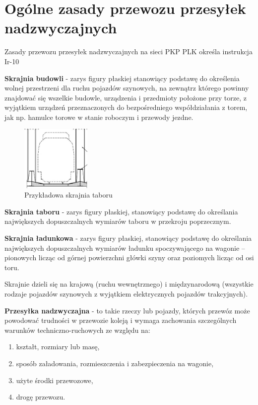 \chapter{Ogólne zasady przewozu przesyłek nadzwyczajnych}
Zasady przewozu przesyłek nadzwyczajnych na sieci PKP PLK określa instrukcja Ir-10

\textbf{Skrajnia budowli} - zarys figury płaskiej stanowiący podstawę do określenia wolnej przestrzeni dla ruchu pojazdów szynowych, na zewnątrz którego powinny znajdować się wszelkie budowle, urządzenia i przedmioty położone przy torze, z wyjątkiem urządzeń przeznaczonych do bezpośredniego współdziałania z torem, jak np. hamulce torowe w stanie roboczym i przewody jezdne.

\begin{figure}
	\includegraphics[width=0.3\textwidth]{skryptkierownik-img/skrajnia.jpg}
	\caption{Przykładowa skrajnia taboru}
\end{figure}
\textbf{Skrajnia taboru} - zarys figury płaskiej, stanowiący podstawę do określania największych dopuszczalnych wymiarów taboru w przekroju poprzecznym.

\textbf{Skrajnia ładunkowa} - zarys figury płaskiej, stanowiący podstawę do określania największych dopuszczalnych wymiarów ładunku spoczywającego na wagonie – pionowych licząc od górnej powierzchni główki szyny oraz poziomych licząc od osi toru.

Skrajnie dzieli się na krajową (ruchu wewnętrznego) i międzynarodową (wszystkie rodzaje pojazdów szynowych z wyjątkiem elektrycznych pojazdów trakcyjnych).

\textbf{Przesyłka nadzwyczajna} - to takie rzeczy lub pojazdy, których przewóz może powodować trudności w przewozie koleją i wymaga zachowania szczególnych warunków techniczno-ruchowych ze względu na: 

\begin{enumerate}
	\item kształt, rozmiary lub masę,
	\item sposób załadowania, rozmieszczenia i zabezpieczenia na wagonie,
	\item użyte środki przewozowe,
	\item drogę przewozu.
\end{enumerate}

